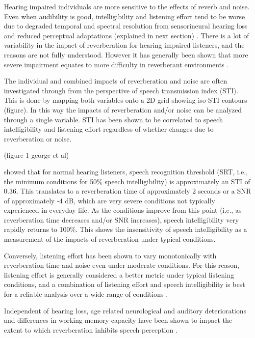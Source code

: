 Hearing impaired individuals are more sensitive to the effects of reverb and noise. Even when audibility is good, intelligibility and listening effort tend to be worse due to degraded temporal and spectral resolution from sensorineural hearing loss \citep{reinhart2018listener} and reduced perceptual adaptations (explained in next section) \citep{srinivasan2017role, roberts2003effects}. There is a lot of variability in the impact of reverberation for hearing impaired listeners, and the reasons are not fully understood. However it has generally been shown that more severe impairment equates to more difficulty in reverberant environments \citep{xia2018effects}.

The individual and combined impacts of reverberation and noise are often investigated through from the perspective of speech transmission index (STI). This is done by mapping both variables onto a 2D grid showing iso-STI contours (figure). In this way the impacts of reverberation and/or noise can be analyzed through a single variable. STI has been shown to be correlated to speech intelligibility and listening effort regardless of whether changes due to reverberation or noise.

(figure 1 george et al)

\cite{george2010measuring} showed that for normal hearing listeners, speech recognition threshold (SRT, i.e., the minimum conditions for 50\% speech intelligibility) is approximately an STI of 0.36. This translates to a reverberation time of approximately 2 seconds or a SNR of approximately -4 dB, which are very severe conditions not typically experienced in everyday life. As the conditions improve from this point (i.e., as reverberation time decreases and/or SNR increases), speech intelligibility very rapidly returns to 100\%. This shows the insensitivity of speech intelligibility as a measurement of the impacts of reverberation under typical conditions.

Conversely, listening effort has been shown to vary monotonically with reverberation time and noise even under moderate conditions. For this reason, listening effort is generally considered a better metric under typical listening conditions, and a combination of listening effort and speech intelligibility is best for a reliable analysis over a wide range of conditions \citep{schepker2016perceived}.

Independent of hearing loss, age related neurological and auditory deteriorations and differences in working memory capacity have been shown to impact the extent to which reverberation inhibits speech perception \citep{reinhart2018listener}.

